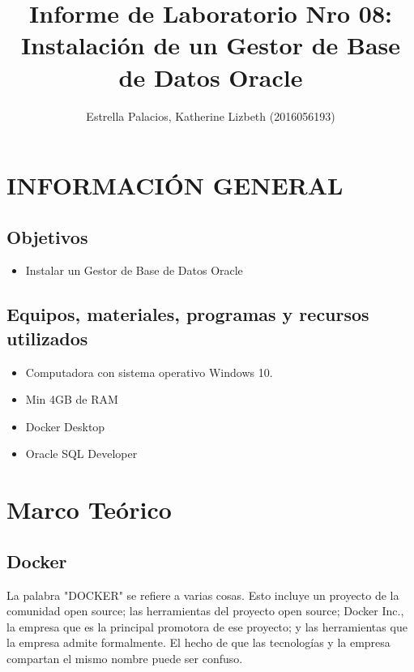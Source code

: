 \documentclass[preprint,12pt]{elsarticle}
\begin{document}
	
	\begin{frontmatter} 

		\title{\huge Informe de Laboratorio Nro 08: Instalación de un Gestor de Base de Datos Oracle}
		
		\author{Estrella Palacios, Katherine Lizbeth         	(2016056193)} 
		\address{Escuela Profesional de Ingeniería de Sistemas}
		\address{Universidad Privada de Tacna}
		\address{Tacna, Perú}
		

	\end{frontmatter}



\section{INFORMACIÓN GENERAL} 

\subsection {\textbf{Objetivos}}
\begin{itemize}
	\item Instalar un Gestor de Base de Datos Oracle
\end{itemize}

\subsection {\textbf{Equipos, materiales, programas y recursos utilizados}}
\begin{itemize}
	\item Computadora con sistema operativo Windows 10.
	\item Min 4GB de RAM
	\item Docker Desktop
	\item Oracle SQL Developer
\end{itemize}


\section{Marco Teórico}



\subsection {\textbf{Docker}}
La palabra "DOCKER" se refiere a varias cosas. Esto incluye un proyecto de la comunidad open source; las herramientas del proyecto open source; Docker Inc., la empresa que es la principal promotora de ese proyecto; y las herramientas que la empresa admite formalmente. El hecho de que las tecnologías y la empresa compartan el mismo nombre puede ser confuso.
\end{document}
